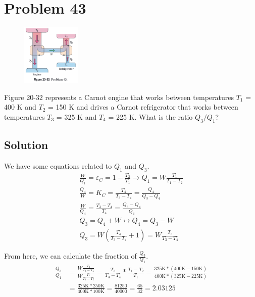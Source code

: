 \documentclass[12pt]{article}
\begin{document}
    \pagebreak
    \section{Problem 43}
        \begin{figure}
            \vspace{-30pt}
            \includegraphics[width=0.25\textwidth]{picture_20-32.png} 
        \end{figure}
        Figure 20-32 represents a Carnot engine that works between temperatures $T_1$ = 400 K and $T_2$ = 150 K and drives a Carnot refrigerator that works between temperatures $T_3$ = 325 K and $T_4$ = 225 K. 
        What is the ratio $Q_3/Q_1$?

        \subsection{Solution}
            We have some equations related to $Q_1$ and $Q_3$. 
            \begin{gather}
                \frac{W}{Q_1} = \varepsilon_C = 1 - \frac{T_2}{T_1} \to
                Q_1 = W \frac{T_1}{T_1 - T_2}\\
                \frac{Q_4}{W} = K_C = \frac{T_4}{T_3 - T_4} = \frac{Q_4}{Q_3 - Q_4}\\
                \frac{W}{Q_4} = \frac{T_3 - T_4}{T_4} = \frac{Q_3 - Q_4}{Q_4}\\
                Q_3 = Q_4 + W \leftrightarrow Q_4 = Q_3 - W\\
                Q_3 = W \left( \frac{T_4}{T_3 - T_4} + 1 \right)
                    =   W \frac{T_3}{T_3 - T_4}
            \end{gather}

            From here, we can calculate the fraction of $\frac{Q_3}{Q_1}$.
            \begin{align}
                \frac{Q_3}{Q_1} &=  \frac{W \frac{T_3}{T_3 - T_4}}{W \frac{T_1}{T_1 - T_2}}
                    =   \frac{T_3}{T_3 - T_4} * \frac{T_1 - T_2}{T_1}
                    =   \frac{325\unit{\kelvin} * (400\unit{\kelvin} - 150\unit{\kelvin})}{400\unit{\kelvin} * (325\unit{\kelvin} - 225\unit{\kelvin})}\\
                    &=  \frac{325\unit{\kelvin} * 250\unit{\kelvin}}{400\unit{\kelvin} * 100\unit{\kelvin}}
                    =   \frac{81250}{40000}
                    =   \frac{65}{32}
                    =   \boxed{2.03125}
            \end{align}
\end{document}
